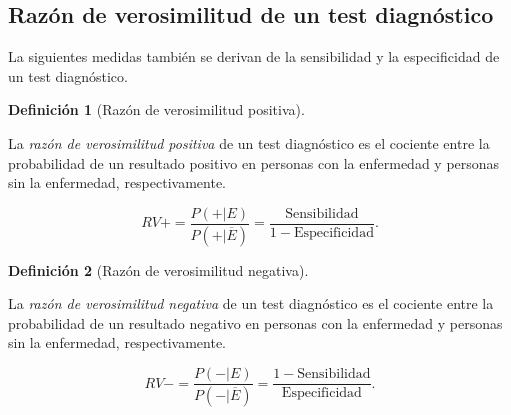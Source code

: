 \documentclass[
  spanish,
  a4paper,
]{scrreport}
\theoremstyle{plain}
\theoremstyle{definition}
\theoremstyle{definition}
\newtheorem{definition}{Definición}[chapter]
\theoremstyle{remark}
\begin{document}
\subsection{Razón de verosimilitud de un test
diagnóstico}\label{razuxf3n-de-verosimilitud-de-un-test-diagnuxf3stico}

La siguientes medidas también se derivan de la sensibilidad y la
especificidad de un test diagnóstico.

\begin{definition}[Razón de verosimilitud
positiva]\protect\hypertarget{def-razon-verosimilitud-positiva}{}\label{def-razon-verosimilitud-positiva}

La \emph{razón de verosimilitud positiva} de un test diagnóstico es el
cociente entre la probabilidad de un resultado positivo en personas con
la enfermedad y personas sin la enfermedad, respectivamente.

\[RV+=\frac{P(+|E)}{P(+|\overline{E})} = \frac{\mbox{Sensibilidad}}{1-\mbox{Especificidad}}.\]

\end{definition}

\begin{definition}[Razón de verosimilitud
negativa]\protect\hypertarget{def-razon-verosimilitud-negativa}{}\label{def-razon-verosimilitud-negativa}

La \emph{razón de verosimilitud negativa} de un test diagnóstico es el
cociente entre la probabilidad de un resultado negativo en personas con
la enfermedad y personas sin la enfermedad, respectivamente.

\[RV-=\frac{P(-|E)}{P(-|\overline{E})} = \frac{1-\mbox{Sensibilidad}}{\mbox{Especificidad}}.\]

\end{definition}
\end{document}
